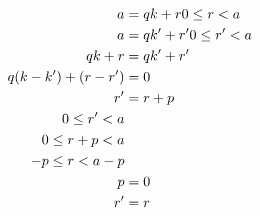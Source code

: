 \documentclass{article}
\begin{document}
	\begin{align}
	a & = qk + r \space 0 \le r < a \\
	a & = qk' + r' \space 0 \le r' < a \\
	qk + r & = qk' + r' \\
	q(k - k') + (r - r') & = 0 \\
	r' & = r + p \\
	0 \le r' < a \\
	0 \le r + p < a \\
	-p \le r < a - p \\
	p & = 0 \\
	r' & = r
	\end{align}
\end{document}
